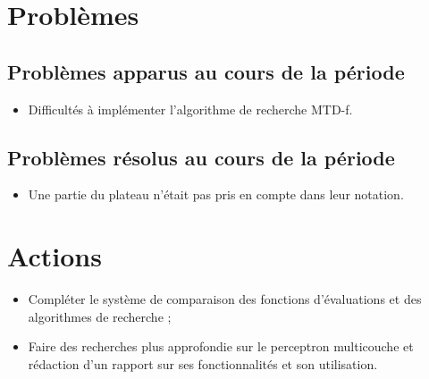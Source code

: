 \documentclass[a4paper]{article}
\begin{document}
\section*{Problèmes}
	\subsection*{Problèmes apparus au cours de la période}
		\begin{itemize}
			\item Difficultés à implémenter l'algorithme de recherche MTD-f.
		\end{itemize}

	\subsection*{Problèmes résolus au cours de la période}
		\begin{itemize}
			\item Une partie du plateau n'était pas pris en compte dans leur notation.
		\end{itemize}


\section*{Actions}
	\begin{itemize}
		\item Compléter le système de comparaison des fonctions d'évaluations
			et des algorithmes de recherche ;
		\item Faire des recherches plus approfondie sur le perceptron multicouche et
		rédaction d'un rapport sur ses fonctionnalités et son utilisation.
	\end{itemize}
\end{document}
